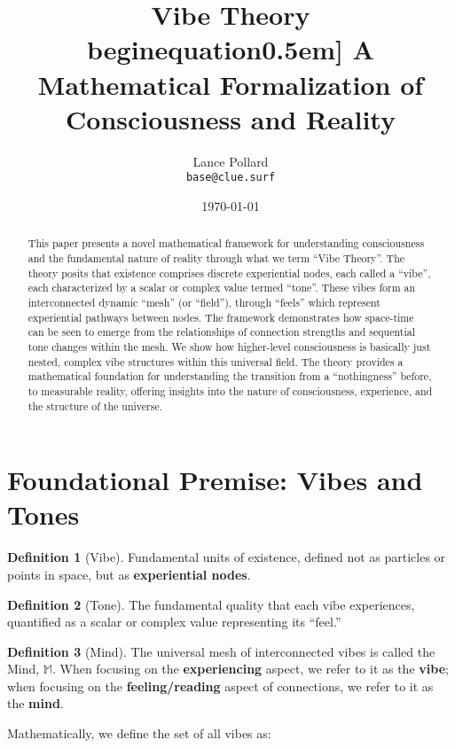 \documentclass{article}
\title{
  {\huge \textbf{Vibe Theory}} \\begin{equation}0.5em]  %
  \large A Mathematical Formalization of Consciousness and Reality
}
\author{Lance Pollard \\ \texttt{base@clue.surf}}
\date{\today}
\date{}
\theoremstyle{definition}
\newtheorem{definition}{Definition}      %
\begin{document}
\maketitle

\begin{abstract}
This paper presents a novel mathematical framework for understanding consciousness and the fundamental nature of reality through what we term \enquote{Vibe Theory}. The theory posits that existence comprises discrete experiential nodes, each called a \enquote{vibe}, each characterized by a scalar or complex value termed \enquote{tone}. These vibes form an interconnected dynamic \enquote{mesh} (or \enquote{field}), through \enquote{feels} which represent experiential pathways between nodes. The framework demonstrates how space-time can be seen to emerge from the relationships of connection strengths and sequential tone changes within the mesh. We show how higher-level consciousness is basically just nested, complex vibe structures within this universal field. The theory provides a mathematical foundation for understanding the transition from a \enquote{nothingness} before, to measurable reality, offering insights into the nature of consciousness, experience, and the structure of the universe.
\end{abstract}

\section{Foundational Premise: Vibes and Tones}
\begin{definition}[Vibe]
Fundamental units of existence, defined not as particles or points in space, but as \textbf{experiential nodes}.
\end{definition}

\begin{definition}[Tone]
The fundamental quality that each vibe experiences, quantified as a scalar or complex value representing its \enquote{feel.}
\end{definition}

\begin{definition}[Mind]
The universal mesh of interconnected vibes is called the Mind, $\mathbb{M}$. When focusing on the \textbf{experiencing} aspect, we refer to it as the \textbf{vibe}; when focusing on the \textbf{feeling/reading} aspect of connections, we refer to it as the \textbf{mind}.
\end{definition}

Mathematically, we define the set of all vibes as:
\end{document}

